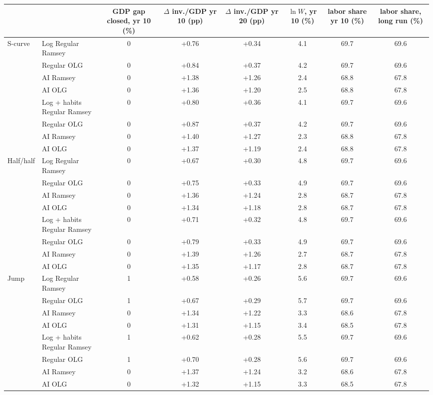 \begin{tabular}{llcccccc}\toprule
 & & GDP gap closed, yr 10 (\%) & $\Delta$ inv./GDP yr 10 (pp) & $\Delta$ inv./GDP yr 20 (pp) & $\ln W$, yr 10 (\%) & labor share yr 10 (\%) & labor share, long run (\%)\\\midrule
S-curve & Log Regular Ramsey & 0 & +0.76 & +0.34 & 4.1 & 69.7 & 69.6\\
 &  Regular OLG & 0 & +0.84 & +0.37 & 4.2 & 69.7 & 69.6\\
 &  AI Ramsey & 0 & +1.38 & +1.26 & 2.4 & 68.8 & 67.8\\
 &  AI OLG & 0 & +1.36 & +1.20 & 2.5 & 68.8 & 67.8\\
\midrule
 & Log + habits Regular Ramsey & 0 & +0.80 & +0.36 & 4.1 & 69.7 & 69.6\\
 &  Regular OLG & 0 & +0.87 & +0.37 & 4.2 & 69.7 & 69.6\\
 &  AI Ramsey & 0 & +1.40 & +1.27 & 2.3 & 68.8 & 67.8\\
 &  AI OLG & 0 & +1.37 & +1.19 & 2.4 & 68.8 & 67.8\\
\midrule
Half/half & Log Regular Ramsey & 0 & +0.67 & +0.30 & 4.8 & 69.7 & 69.6\\
 &  Regular OLG & 0 & +0.75 & +0.33 & 4.9 & 69.7 & 69.6\\
 &  AI Ramsey & 0 & +1.36 & +1.24 & 2.8 & 68.7 & 67.8\\
 &  AI OLG & 0 & +1.34 & +1.18 & 2.8 & 68.7 & 67.8\\
\midrule
 & Log + habits Regular Ramsey & 0 & +0.71 & +0.32 & 4.8 & 69.7 & 69.6\\
 &  Regular OLG & 0 & +0.79 & +0.33 & 4.9 & 69.7 & 69.6\\
 &  AI Ramsey & 0 & +1.39 & +1.26 & 2.7 & 68.7 & 67.8\\
 &  AI OLG & 0 & +1.35 & +1.17 & 2.8 & 68.7 & 67.8\\
\midrule
Jump & Log Regular Ramsey & 1 & +0.58 & +0.26 & 5.6 & 69.7 & 69.6\\
 &  Regular OLG & 1 & +0.67 & +0.29 & 5.7 & 69.7 & 69.6\\
 &  AI Ramsey & 0 & +1.34 & +1.22 & 3.3 & 68.6 & 67.8\\
 &  AI OLG & 0 & +1.31 & +1.15 & 3.4 & 68.5 & 67.8\\
\midrule
 & Log + habits Regular Ramsey & 1 & +0.62 & +0.28 & 5.5 & 69.7 & 69.6\\
 &  Regular OLG & 1 & +0.70 & +0.28 & 5.6 & 69.7 & 69.6\\
 &  AI Ramsey & 0 & +1.37 & +1.24 & 3.2 & 68.6 & 67.8\\
 &  AI OLG & 0 & +1.32 & +1.15 & 3.3 & 68.5 & 67.8\\
\bottomrule\end{tabular}
